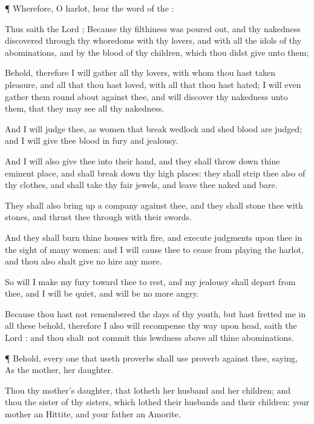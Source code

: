 {\par }{\PP {}¶ Wherefore, O
harlot,
hear the
word of the
{}:

Thus
saith the
Lord
{}; Because thy
filthiness was poured
out, and thy
nakedness
discovered through thy
whoredoms with thy
lovers, and with all the
idols of thy
abominations, and by the
blood of thy
children, which thou didst
give unto them;

Behold, therefore I will
gather all thy
lovers, with whom thou hast taken
pleasure, and all
{} that thou hast
loved, with all
{} that thou hast
hated; I will even
gather them round
about against thee, and will
discover thy
nakedness unto them, that they may
see all thy
nakedness.

And I will
judge thee, as women that break
wedlock and
shed
blood are
judged; and I will
give thee
blood in
fury and
jealousy.

And I will also
give thee into their
hand, and they shall throw
down thine eminent
place, and shall break
down thy high
places: they shall
strip thee also of thy
clothes, and shall
take thy
fair
jewels, and
leave thee
naked and
bare.

They shall also bring
up a
company against thee, and they shall
stone thee with
stones, and thrust thee
through with their
swords.

And they shall
burn thine
houses with
fire, and
execute
judgments upon thee in the
sight of
many
women: and I will cause thee to
cease from playing the
harlot, and thou also shalt
give no
hire any more.

So will I make my
fury toward thee to
rest, and my
jealousy shall
depart from thee, and I will be
quiet, and will be no more
angry.

Because thou hast not
remembered the
days of thy
youth, but hast
fretted me in all these
{}
behold, therefore I also will
recompense thy
way upon
{}
head,
saith the
Lord
{}: and thou shalt not
commit this
lewdness above all thine
abominations.


\par }{\PP {}¶ Behold, every one that useth
proverbs shall use
{}
proverb against thee,
saying, As
{} the
mother,
{} her
daughter.

Thou
{} thy
mother’s
daughter, that
lotheth her
husband and her
children; and thou
{} the
sister of thy
sisters, which
lothed their
husbands and their
children: your
mother
{} an
Hittite, and your
father an
Amorite.

}
